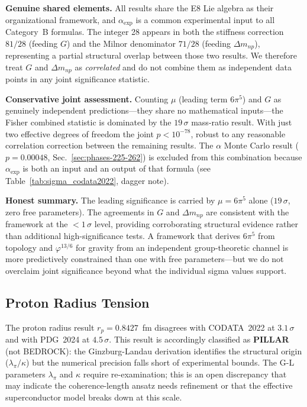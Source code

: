 \documentclass[aps,prd,twocolumn,superscriptaddress,floatfix,nofootinbib]{revtex4-2}
\theoremstyle{definition}
\theoremstyle{remark}
\newcommand{\vp}{\varphi}
\begin{document}
\textbf{Genuine shared elements.}
All results share the E8 Lie algebra as their organizational framework, and
$\alpha_\text{exp}$ is a common experimental input to all Category~B formulas.
The integer 28 appears in both the stiffness correction $81/28$ (feeding $G$)
and the Milnor denominator $71/28$ (feeding $\Delta m_{np}$), representing a
partial structural overlap between those two results.  We therefore treat $G$
and $\Delta m_{np}$ as \emph{correlated} and do not combine them as independent
data points in any joint significance statistic.

\textbf{Conservative joint assessment.}
Counting $\mu$ (leading term $6\pi^5$) and $G$ as genuinely independent
predictions---they share no mathematical inputs---the Fisher combined statistic
is dominated by the $19\,\sigma$ mass-ratio result.  With just two effective
degrees of freedom the joint $p < 10^{-78}$, robust to any reasonable
correlation correction between the remaining results.  The $\alpha$ Monte Carlo
result ($p = 0.00048$, Sec.~\ref{sec:phases-225-262}) is excluded from this
combination because $\alpha_\text{exp}$ is both an input and an output of that
formula (see Table~\ref{tab:sigma_codata2022}, dagger note).

\textbf{Honest summary.}
The leading significance is carried by $\mu = 6\pi^5$ alone ($19\,\sigma$,
zero free parameters).  The agreements in $G$ and $\Delta m_{np}$ are
consistent with the framework at the $<1\,\sigma$ level, providing corroborating
structural evidence rather than additional high-significance tests.  A framework
that derives $6\pi^5$ from topology and $\vp^{13/6}$ for gravity from an
independent group-theoretic channel is more predictively constrained than one
with free parameters---but we do not overclaim joint significance beyond what the
individual sigma values support.

\subsection{Proton Radius Tension}

The proton radius result $r_p = 0.8427$~fm disagrees with CODATA~2022 at $3.1\,\sigma$
and with PDG~2024 at $4.5\,\sigma$. This result is accordingly classified as
\textbf{PILLAR} (not BEDROCK): the Ginzburg-Landau derivation identifies
the structural origin ($\lambda_\pi/\kappa$) but the numerical precision falls
short of experimental bounds. The G-L parameters $\lambda_\pi$ and $\kappa$
require re-examination; this is an open discrepancy that may indicate
the coherence-length ansatz needs refinement or that the effective
superconductor model breaks down at this scale.
\end{document}
